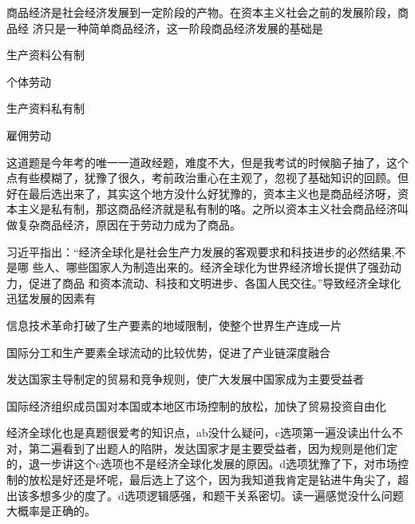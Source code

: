 \documentclass[lang=cn,newtx,10pt,scheme=chinese,pad,twocol]{zznote}
\begin{document}
\begin{exercise}商品经济是社会经济发展到一定阶段的产物。在资本主义社会之前的发展阶段，商品经 济只是一种简单商品经济，这一阶段商品经济发展的基础是
	\begin{choice}
		\item 生产资料公有制
		\item 个体劳动
		\item 生产资料私有制
		\item 雇佣劳动
	\end{choice}
\end{exercise}
\begin{solution}
	这道题是今年考的唯一一道政经题，难度不大，但是我考试的时候脑子抽了，这个点有些模糊了，犹豫了很久，考前政治重心在主观了，忽视了基础知识的回顾。但好在最后选出来了，其实这个地方没什么好犹豫的，资本主义也是商品经济呀，资本主义是私有制，那这商品经济就是私有制的咯。之所以资本主义社会商品经济叫做复杂商品经济，原因在于劳动力成为了商品。
\end{solution}

\begin{exercise}习近平指出：“经济全球化是社会生产力发展的客观要求和科技进步的必然结果,不是哪 些人、哪些国家人为制造出来的。经济全球化为世界经济增长提供了强劲动力，促进了商品 和资本流动、科技和文明进步、各国人民交往。”导致经济全球化迅猛发展的因素有
	\begin{choice}
		\item 信息技术革命打破了生产要素的地域限制，使整个世界生产连成一片
		\item 国际分工和生产要素全球流动的比较优势，促进了产业链深度融合
		\item 发达国家主导制定的贸易和竞争规则，使广大发展中国家成为主要受益者
		\item 国际经济组织成员国对本国或本地区市场控制的放松，加快了贸易投资自由化
	\end{choice}
\end{exercise}
\begin{solution}
	经济全球化也是真题很爱考的知识点，ab没什么疑问，c选项第一遍没读出什么不对，第二遍看到了出题人的陷阱，发达国家才是主要受益者，因为规则是他们定的，退一步讲这个c选项也不是经济全球化发展的原因。d选项犹豫了下，对市场控制的放松是好还是坏呢，最后选上了这个，因为我知道我肯定是钻进牛角尖了，超出该多想多少的度了。d选项逻辑感强，和题干关系密切。读一遍感觉没什么问题大概率是正确的。
\end{solution}
\end{document}
